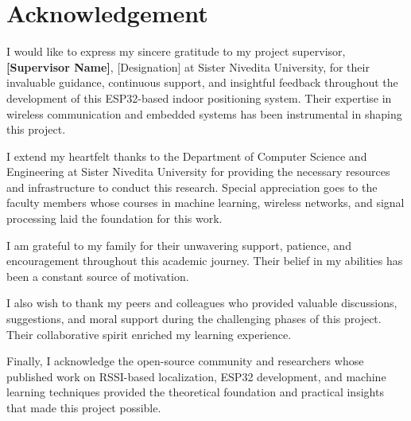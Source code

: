 \chapter{Acknowledgement}
\vspace{-0.5cm}
\singlespacing
I would like to express my sincere gratitude to my project supervisor, \textbf{[Supervisor Name]}, [Designation] at Sister Nivedita University, for their invaluable guidance, continuous support, and insightful feedback throughout the development of this ESP32-based indoor positioning system. Their expertise in wireless communication and embedded systems has been instrumental in shaping this project.\par

I extend my heartfelt thanks to the Department of Computer Science and Engineering at Sister Nivedita University for providing the necessary resources and infrastructure to conduct this research. Special appreciation goes to the faculty members whose courses in machine learning, wireless networks, and signal processing laid the foundation for this work.\par

I am grateful to my family for their unwavering support, patience, and encouragement throughout this academic journey. Their belief in my abilities has been a constant source of motivation.\par

I also wish to thank my peers and colleagues who provided valuable discussions, suggestions, and moral support during the challenging phases of this project. Their collaborative spirit enriched my learning experience.\par

Finally, I acknowledge the open-source community and researchers whose published work on RSSI-based localization, ESP32 development, and machine learning techniques provided the theoretical foundation and practical insights that made this project possible.




